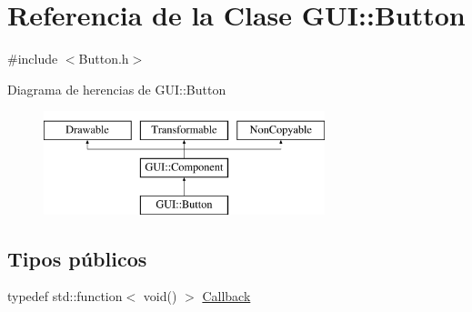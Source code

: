 \hypertarget{classGUI_1_1Button}{}\section{Referencia de la Clase G\+U\+I\+:\+:Button}
\label{classGUI_1_1Button}


{\ttfamily \#include $<$Button.\+h$>$}

Diagrama de herencias de G\+U\+I\+:\+:Button\begin{figure}[H]
\begin{center}
\leavevmode
\includegraphics[height=3.000000cm]{classGUI_1_1Button}
\end{center}
\end{figure}
\subsection*{Tipos públicos}
\begin{DoxyCompactItemize}
\item 
typedef std\+::function$<$ void() $>$ \hyperlink{classGUI_1_1Button_ae42ce66ac9fd4834cef81bb6f2fb0dab}{Callback}
\end{DoxyCompactItemize}
